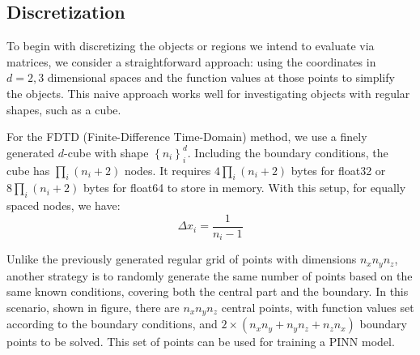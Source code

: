 \subsection{Discretization}
To begin with discretizing the objects or regions we intend to 
evaluate via matrices, we consider a straightforward approach: 
using the coordinates in $d=2,3$ dimensional spaces and the function 
values at those points to simplify the objects. 
This naive approach works well for investigating objects with regular shapes, such as a cube.

For the FDTD (Finite-Difference Time-Domain) method, we use a finely 
generated $d$-cube with shape $\left\{n_i\right\}_i^{d}$. Including 
the boundary conditions, the cube has $\prod_i (n_i+2)$ nodes. 
It requires $4\prod_i (n_i+2)$ bytes for float32 or $8\prod_i (n_i+2)$ bytes 
for float64 to store in memory. 
With this setup, for equally spaced nodes, we have:
\begin{equation}
  \Delta x_i = \frac{1}{n_i-1}
\end{equation}

Unlike the previously generated regular grid of 
points with dimensions $n_xn_yn_z$, 
another strategy is to randomly generate the same number of points based on the same known conditions, 
covering both the central part and the boundary. 
In this scenario, 
shown in figure, 
there are $n_x n_yn_z$ central points, 
with function values set according to the boundary conditions, 
and $2 \times(n_xn_y + n_yn_z + n_zn_x)$ boundary points to be solved. 
This set of points can be used for training a PINN model.


  


